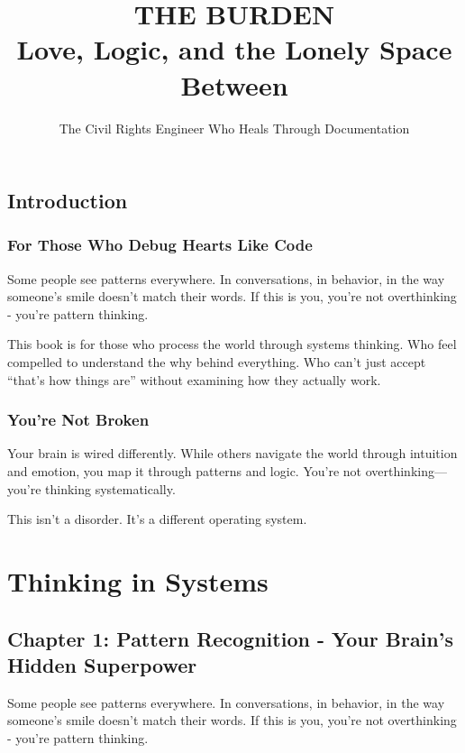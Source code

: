\documentclass[12pt,oneside]{book}
\title{\Huge\textbf{THE BURDEN}\\[0.5cm]
\Large Love, Logic, and the Lonely Space Between}
\author{The Civil Rights Engineer Who Heals Through Documentation}
\date{}
\begin{document}
\maketitle

\frontmatter
\tableofcontents

\mainmatter

\chapter*{Introduction}
\section*{For Those Who Debug Hearts Like Code}

Some people see patterns everywhere. In conversations, in behavior, in the way someone's smile doesn't match their words. If this is you, you're not overthinking - you're pattern thinking.

This book is for those who process the world through systems thinking. Who feel compelled to understand the why behind everything. Who can't just accept ``that's how things are'' without examining how they actually work.

\section*{You're Not Broken}

Your brain is wired differently. While others navigate the world through intuition and emotion, you map it through patterns and logic. You're not overthinking—you're thinking systematically.

This isn't a disorder. It's a different operating system.

\part{Thinking in Systems}

\chapter{Chapter 1: Pattern Recognition - Your Brain's Hidden Superpower}

Some people see patterns everywhere. In conversations, in behavior, in the way someone's smile doesn't match their words. If this is you, you're not overthinking - you're pattern thinking.
\end{document}

